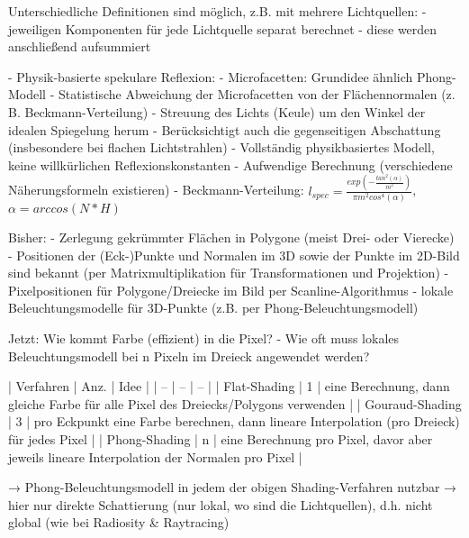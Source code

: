 \documentclass[10pt,landscape]{article}
\makeatletter
\renewcommand{\section}{\@startsection{section}{1}{0mm}%
                                {-1ex plus -.5ex minus -.2ex}%
                                {0.5ex plus .2ex}%
                                {\normalfont\large\bfseries}}
\renewcommand{\subsection}{\@startsection{subsection}{2}{0mm}%
                                {-1explus -.5ex minus -.2ex}%
                                {0.5ex plus .2ex}%
                                {\normalfont\normalsize\bfseries}}
\makeatother
\begin{document}
\begin{multicols}{3}
Unterschiedliche Definitionen sind möglich, z.B. mit mehrere Lichtquellen:
- jeweiligen Komponenten für jede Lichtquelle separat berechnet
- diese werden anschließend aufsummiert

- Physik-basierte spekulare Reflexion:
- Microfacetten: Grundidee ähnlich Phong-Modell
- Statistische Abweichung der Microfacetten von der Flächennormalen (z. B. Beckmann-Verteilung)
- Streuung des Lichts (Keule) um den Winkel der idealen Spiegelung herum
- Berücksichtigt auch die gegenseitigen Abschattung (insbesondere bei flachen Lichtstrahlen)
- Vollständig physikbasiertes Modell, keine willkürlichen Reflexionskonstanten
- Aufwendige Berechnung (verschiedene Näherungsformeln existieren)
- Beckmann-Verteilung: $l_{spec}=\frac{exp(-\frac{tan^2(\alpha)}{m^2})}{\pi m^2 cos^4 (\alpha)}$, $\alpha=arccos(N*H)$

Bisher:
- Zerlegung gekrümmter Flächen in Polygone (meist Drei- oder Vierecke)
- Positionen der (Eck-)Punkte und Normalen im 3D sowie der Punkte im 2D-Bild sind bekannt (per Matrixmultiplikation für Transformationen und Projektion)
- Pixelpositionen für Polygone/Dreiecke im Bild per Scanline-Algorithmus
- lokale Beleuchtungsmodelle für 3D-Punkte (z.B. per Phong-Beleuchtungsmodell)

Jetzt: Wie kommt Farbe (effizient) in die Pixel?
- Wie oft muss lokales Beleuchtungsmodell bei n Pixeln im Dreieck angewendet werden?

| Verfahren  | Anz. | Idee |
| -- | -- | -- |
| Flat-Shading | 1 | eine Berechnung, dann gleiche Farbe für alle Pixel des Dreiecks/Polygons verwenden |
| Gouraud-Shading | 3 | pro Eckpunkt eine Farbe berechnen, dann lineare Interpolation (pro Dreieck) für jedes Pixel |
| Phong-Shading | n | eine Berechnung pro Pixel, davor aber jeweils lineare Interpolation der Normalen pro Pixel |

→ Phong-Beleuchtungsmodell in jedem der obigen Shading-Verfahren nutzbar
→ hier nur direkte Schattierung (nur lokal, wo sind die Lichtquellen), d.h. nicht global (wie bei Radiosity \& Raytracing)


\end{multicols}
\end{document}
